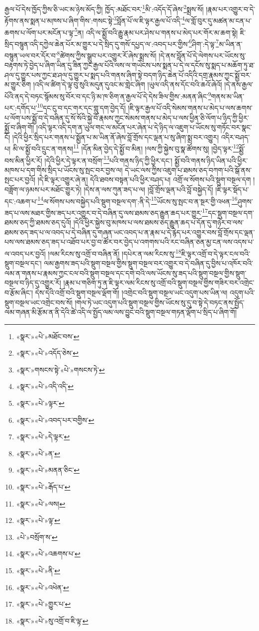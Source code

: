 རྒྱལ་པོ་དེས་ཁྱོད་ཀྱིས་ཅི་ཡང་མ་ཉེས་མོད་ཀྱི། ཁྱོད་:མཐོང་བར་\footnote{«སྣར་»«པེ་»མཐོང་བས་}མི་:འདོད་དོ་ཞེས་\footnote{«སྣར་»«པེ་»འདོད་ཅེས་}སྨྲས་སོ། །རྣམ་པར་འགྱུར་བ་དེ་རྟོགས་ནས་སྨན་པ་མཁས་པ་ཞིག་གིས་:གསང་སྟེ་\footnote{«སྣར་»གསངས་སྟེ་«པེ་»གསངས་ཏེ་}བློན་པོ་ལ་ཇི་ལྟར་རྒྱལ་པོ་འདི་\footnote{«སྣར་»«པེ་»འདི་འདི་}ལ་གློ་བུར་དུ་མཚན་མ་ངན་པ་ཆགས་པ་ལོག་པར་མངོན་པ་ལྟ་\footnote{«སྣར་»«པེ་»ལྟར་}ན། འདི་ལ་སྨྱོ་བའི་རྒྱུ་རྣམ་པར་ཤེས་པ་གནས་པ་མེད་པར་གོར་མ་ཆག་སྟེ། ཇི་སྲིད་བསྙུན་འདི་དཀྱེལ་ཆེན་པོར་མ་གྱུར་པ་དེ་སྲིད་དུ་གསོ་དཔྱད་ལ་:འབད་པར་གྱིས་\footnote{«སྣར་»«པེ་»འབད་པར་བགྱིས་}ཤིག་:དེ་ལྟ་\footnote{«སྣར་»«པེ་»དེ་ལྟར་}མ་ཡིན་ན་བསྙུན་ཡལ་བར་དོར་བ་\footnote{«སྣར་»«པེ་»ན་}ཚེགས་ཀྱིས་སྒྲུབ་པར་འགྱུར་རོ་ཞེས་སྨྲས་སོ། །དེ་ནས་བློན་པོ་དེ་ལེགས་པར་ཡོངས་སུ་བརྟགས་ཏེ་བྱེད་པ་ཞིག་ཡིན་དུ་ཟིན་ཀྱང་རྒྱལ་པོའི་ལས་ལ་གཡེངས་པས་སྨན་པ་དེ་ལ་དངོས་སུ་སྨད་པ་མཆོག་ཏུ་ཐ་ཤལ་དུ་གྱུར་པས་ཀྱང་ཐ་ཤལ་དུ་གྱུར་པ་སྨད་པའི་གནས་ཞིག་སྟེ་བདག་ཉིད་ཆེན་པོ་འདིའི་དགྲ་རྣམས་ཀྱང་སྨྱོ་བར་མ་གྱུར་ཅིག །འདི་ལ་ཚིག་དེ་ལྟ་བུ་སུའི་མདུན་དུའང་མ་གླེང་ཞིག །ཡུལ་འདི་ནས་དོང་བའི་ཆའོ་ཞེའོ། །དེ་ནས་རྒྱལ་པོའི་ནད་དེ་བཏང་སྙོམས་སུ་བོར་བ་དང་ཉི་མ་ཁ་ཅིག་ན་རྒྱལ་པོ་དེ་དེས་ཟིལ་གྱིས་:མནན་ཞིང་\footnote{«སྣར་»«པེ་»མནན་ཅིང་}གནས་མ་ཡིན་པར་:དགོད་པ་\footnote{«སྣར་»«པེ་»རྒོད་པ་}དང་ངུ་བ་དང་གར་དང་གླུ་དག་བྱེད་དོ། །ཇི་ལྟར་རྒྱལ་པོ་འདི་སེམས་གནས་པ་མེད་པ་ལས་ཆགས་པ་ལོག་པས་སྨྱོ་བ་དེ་བཞིན་དུ་སོ་སོའི་སྐྱེ་བོ་རྣམས་ཀྱང་སེམས་གནས་པ་མེད་པ་ལས་ཕྱིན་ཅི་ལོག་པ་ཉིད་ཀྱི་ཕྱིར་སྨྱོ་བ་ཞིག་གོ། །འདི་ལྟར་འདི་དག་ན་ཡུལ་གང་ལ་མངོན་པར་ཞེན་པ་དེ་ཉིད་ལ་འཇུག་པ་ཡོངས་སུ་གཏོང་བར་སྣང་ངོ། །དེའི་ཕྱིར་སྲིད་པར་གནས་པ་སྨྱོན་པ་མ་ཡིན་ནོ་ཞེས་བློ་གྲོས་དང་ལྡན་པ་སུ་ཞིག་སྨྲ་བར་འགྱུར། འདིར་བཤད་པ། མི་ལ་སྨྱོ་བའི་དྲུང་ན་གནས།\footnote{«སྣར་»«པེ་»ལས།} །དོན་མིན་བྱེད་དེ་སྨྱོ་བ་མིན། །ལས་ཀྱི་སྐྱེས་བུ་སྣ་ཚོགས་སུ། །བྱེད་ལྟར་\footnote{«སྣར་»«པེ་»ལྟ་}སྨྱོ་བས་མིན་ཕྱིར་རོ། །དེའི་ཕྱིར་དེ་ལྟར་ན་བསྲོག་\footnote{«པེ་»བསྲོག་ས་}པའི་གནས་ཉིད་ཀྱི་ཕྱིར་དང་། སྨྱོ་བའི་གནས་ཉིད་ཡིན་པའི་ཕྱིར་མཁས་པ་དག་གིས་སྲིད་པ་ཡོངས་སུ་སྤང་བར་བྱས་ལ། དེ་ཡང་ལས་ཀྱིས་འཇུག་པ་ཐམས་ཅད་བཀག་པའི་སྒོ་ནས་སྤང་པར་བྱའོ། །དེ་ཇི་ལྟར་འགྱུར་ཞེ་ན། དེའི་ཐབས་བསྟན་པའི་ཕྱིར་བཤད་པ། འགྲོ་ལ་སོགས་པའི་སྡུག་བསྔལ་དག །བཟློག་ལ་ཉམས་པར་མཐོང་གྱུར་ཏེ། །དེས་ན་ལས་ཀུན་ཟད་པ་ལ། །བློ་གྲོས་ལྡན་པའི་བློ་བསྐྱེད་དོ། །ཇི་ལྟར་སྡོད་པ་དང་:འཆག་པ་\footnote{«སྣར་»«པེ་»འཆགས་པ་}ལ་སོགས་པས་བསྐྱེད་པའི་སྡུག་བསྔལ་དག་:ནི་དེ་\footnote{«སྣར་»«པེ་»ནི་}ཡོངས་སུ་སྤང་བ་ན་སྔར་གྱི་འཕན་\footnote{«སྣར་»«པེ་»འཕེན་}ཤུགས་ཟད་པ་ལས་མཐར་གྱིས་ཟད་པར་འགྱུར་བ་དེ་བཞིན་དུ་ལས་ཐམས་ཅད་རྒྱུན་ཆད་པར་གྱུར་\footnote{«སྣར་»«པེ་»གྱུར་པ་}དང་སྡུག་བསྔལ་དག་ཐམས་ཅད་ཀྱི་ཐམས་ཅད་དུའོ། །དེའི་ཕྱིར་སྐྱེས་བུ་མཁས་པ་ལས་ཐམས་ཅད་རྒྱུན་ཆད་པ་དོན་དུ་གཉེར་བ་ལས་ཐམས་ཅད་ཟད་པ་ལ་འབད་པ་དེ་བཞིན་དུ་གཞན་ཡང་འབད་པ་ན་རྣམ་པ་དེ་རྙེད་པར་འགྱུར་བས་བློ་གྲོས་དང་ལྡན་པས་ལས་ཐམས་ཅད་ཟད་པ་འཐོབ་པར་བྱ་བ་ཚོར་བར་བྱེད་པ་འགགས་པའི་རང་བཞིན་ཅན་མྱ་ངན་ལས་འདས་པ་ལ་འབད་པར་བྱའོ། །ལམ་རིངས་སུ་འགྲོ་བ་བཞིན་ནོ། །དཔེར་ན་ལམ་རིངས་སུ་\footnote{«སྣར་»«པེ་»སུ་འགྲོ་བ་ཇི་ལྟ་}ཇི་ལྟར་འགྲོ་བ་དེ་ལྟར་ངལ་བའི་སྡུག་བསྔལ་དང་། ལམ་རྒྱགས་ཟད་པའི་སྡུག་བསྔལ་གྱིས་སྡུག་བསྔལ་བར་འགྱུར་བ་དེ་བཞིན་དུ་བྱིས་པ་འཁོར་བའི་ལམ་ན་གནས་པ་རྣམས་ཀྱང་ངལ་བའི་སྡུག་བསྔལ་དང་དགེ་བའི་ལས་ཡོངས་སུ་ཟད་པའི་སྡུག་བསྔལ་གྱིས་སྡུག་བསྔལ་བ་ཉིད་དུ་འགྱུར་རོ། །རྣམ་པ་གཅིག་ཏུ་ན་ཇི་ལྟར་ལམ་རིངས་སུ་འགྲོ་བའི་སྡུག་བསྔལ་གྱིས་གཟིར་བར་འགྲེང་བ་རྩོམ་ཞིང་། དེས་དེའི་འགྲོ་བའི་སྡུག་བསྔལ་ལྡོག་གོ། །འགྲེང་བའི་སྡུག་བསྔལ་ཡང་འདུག་པས་ཡིན་ལ། འདུག་པའི་སྡུག་བསྔལ་ཡང་འགྲེང་བས་སོ། །གལ་ཏེ་ཡང་འདུག་པའི་སྡུག་བསྔལ་གྱིས་ཡོངས་སུ་དུ་བ་སྟེ་དེ་བཏང་ནས་སྤྱོད་ལམ་གཞན་མི་རྩོམ་ན་ནི་དེའི་ཚེ་འདི་ལ་སྤྱོད་ལམ་ལས་བྱུང་བའི་སྡུག་བསྔལ་གཏན་ལྡོག་པ་སྲིད་པ་ཞིག་གོ། 